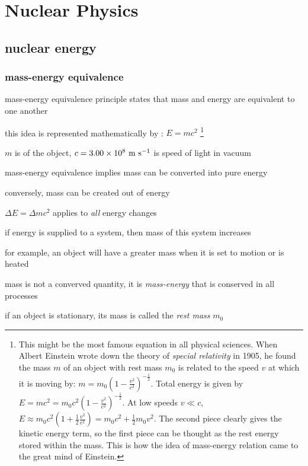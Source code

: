 \section{Nuclear Physics}

\subsection{nuclear energy}

\subsubsection{mass-energy equivalence}

mass-energy equivalence principle states that mass and energy are equivalent to one another

this idea is represented mathematically by : $\boxed{E=mc^2}$
\footnote{This might be the most famous equation in all physical sciences. When Albert Einstein wrote down the theory of \emph{special relativity} in 1905, he found the mass $m$ of an object with rest mass $m_0$ is related to the speed $v$ at which it is moving by: $m=m_0 \left(1-\frac{v^2}{c^2}\right)^{-\frac{1}{2}}$. Total energy is given by $E=mc^2=m_0 c^2 \left(1-\frac{v^2}{c^2}\right)^{-\frac{1}{2}}$. At low speeds $v \ll c$, $E \approx m_0 c^2 \left(1+\frac{1}{2}\frac{v^2}{c^2}\right) = m_0 c^2 + \frac{1}{2}m_0 v^2$. The second piece clearly gives the kinetic energy term, so the first piece can be thought as the rest energy stored within the mass. This is how the idea of mass-energy relation came to the great mind of Einstein.}

$m$ is  of the object, $c = 3.00\times10^8 \text{ m s$^{-1}$}$ is speed of light in vacuum

\cmt mass-energy equivalence implies mass can be converted into pure energy

conversely, mass can be created out of energy

\cmt $\Delta E = \Delta m c^2$ applies to \emph{all} energy changes

if energy is supplied to a system, then mass of this system increases

for example, an object will have a greater mass when it is set to motion or is heated

mass is not a converved quantity, it is \emph{mass-energy} that is conserved in all processes

\cmt if an object is stationary, its mass is called the \emph{rest mass} $m_0$

